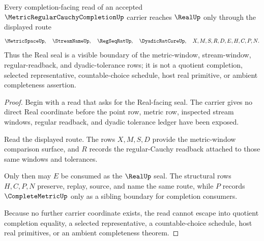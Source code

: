 \begin{theorem}
\label{thm:metric-regular-cauchy-completion-real-seal-boundary}
Every completion-facing read of an accepted $\MetricRegularCauchyCompletionUp$ carrier reaches $\RealUp$ only through the displayed route
$$
\MetricSpaceUp,\quad \StreamNameUp,\quad \RegSeqRatUp,\quad \DyadicRatCoreUp,\quad X,M,S,R,D,E,H,C,P,N .
$$
Thus the Real seal is a visible boundary of the metric-window, stream-window, regular-readback, and dyadic-tolerance rows; it is not a quotient completion, selected representative, countable-choice schedule, host real primitive, or ambient completeness assertion.
\end{theorem}
\begin{proof}
Begin with a read that asks for the Real-facing seal. The carrier gives no direct Real coordinate before the point row, metric row, inspected stream windows, regular readback, and dyadic tolerance ledger have been exposed.

Read the displayed route. The rows $X,M,S,D$ provide the metric-window comparison surface, and $R$ records the regular-Cauchy readback attached to those same windows and tolerances.

Only then may $E$ be consumed as the $\RealUp$ seal. The structural rows $H,C,P,N$ preserve, replay, source, and name the same route, while $P$ records $\CompleteMetricUp$ only as a sibling boundary for completion consumers.

Because no further carrier coordinate exists, the read cannot escape into quotient completion equality, a selected representative, a countable-choice schedule, host real primitives, or an ambient completeness theorem.
\end{proof}

